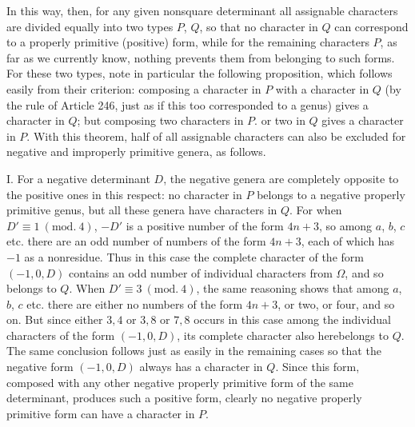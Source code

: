 In this way, then, for any given nonsquare determinant all assignable characters are divided equally into two types $P$, $Q$, so that no character in $Q$ can correspond to a properly primitive (positive) form, while for the remaining characters $P$, as far as we currently know, nothing prevents them from belonging to such forms. For these two types, note in particular the following proposition, which follows easily from their criterion: composing a character in $P$ with a character in $Q$ (by the rule of Article 246, just as if this too corresponded to a genus) gives a character in $Q$; but composing two characters in $P$. or two in $Q$ gives a character in $P$. With this theorem, half of all assignable characters can also be excluded for negative and improperly primitive genera, as follows.

I. For a negative determinant $D$, the negative genera are completely opposite to the positive ones in this respect: no character in $P$ belongs to a negative properly primitive genus, but all these genera have characters in $Q$. For when $D'\equiv1\ (\mathrm{mod.}\ 4)$, $-D'$ is a positive number of the form $4n+3$, so among $a$, $b$, $c$ etc. there are an odd number of numbers of the form $4n+3$, each of which has $-1$ as a nonresidue. Thus in this case the complete character of the form $(-1,0,D)$ contains an odd number of individual characters from $\Omega$, and so belongs to $Q$. When $D'\equiv3\ (\mathrm{mod.}\ 4)$, the same reasoning shows that among $a$, $b$, $c$ etc. there are either no numbers of the form $4n+3$, or two, or four, and so on. But since either $3,4$ or $3,8$ or $7,8$ occurs in this case among the individual characters of the form $(-1,0,D)$, its complete character also here\textperiodcentered{}belongs to $Q$. The same conclusion follows just as easily in the remaining cases
so that the negative form $(-1, 0, D)$ always has a character in $Q$. Since this form, composed with any other negative properly primitive form of the same determinant, produces such a positive form, clearly no negative properly primitive form can have a character in $P$.

